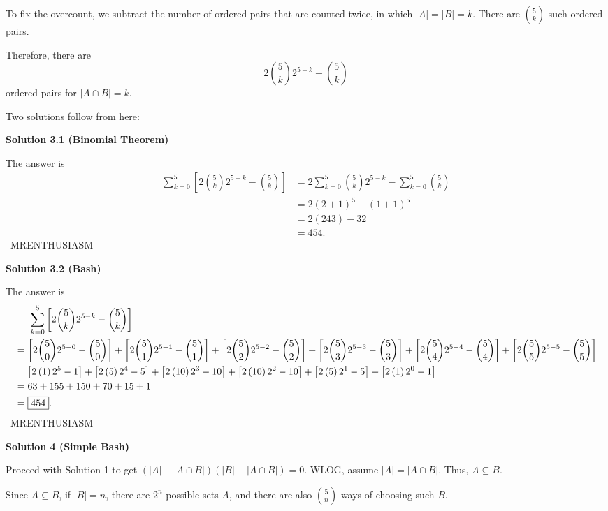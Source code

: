 \begin{enumerate}
 To fix the overcount, we subtract the number of ordered pairs that are counted twice, in which $|A|=|B|=k.$ There are $\binom{5}{k}$ such ordered pairs.

 Therefore, there are 
 \[2\binom{5}{k}2^{5-k}-\binom{5}{k}\] ordered pairs for $|A \cap B|=k.$

 Two solutions follow from here:

 



\textbf{Solution 3.1 (Binomial Theorem)}

The answer is 
 \begin{align*} \sum_{k=0}^{5}\left[2\binom{5}{k}2^{5-k}-\binom{5}{k}\right] &= 2\sum_{k=0}^{5}\binom{5}{k}2^{5-k}-\sum_{k=0}^{5}\binom{5}{k} \\ &=2(2+1)^5-(1+1)^5 \\ &=2(243)-32 \\ &=\boxed{454}. \end{align*}
~MRENTHUSIASM

 



\textbf{Solution 3.2 (Bash)}

The answer is 
 \begin{align*} &\hspace{5.125mm}\sum_{k=0}^{5}\left[2\binom{5}{k}2^{5-k}-\binom{5}{k}\right] \\ &=\left[2\binom{5}{0}2^{5-0}-\binom{5}{0}\right] + \left[2\binom{5}{1}2^{5-1}-\binom{5}{1}\right] + \left[2\binom{5}{2}2^{5-2}-\binom{5}{2}\right] + \left[2\binom{5}{3}2^{5-3}-\binom{5}{3}\right] + \left[2\binom{5}{4}2^{5-4}-\binom{5}{4}\right] + \left[2\binom{5}{5}2^{5-5}-\binom{5}{5}\right] \\ &=\left[2\left(1\right)2^5-1\right] + \left[2\left(5\right)2^4-5\right] + \left[2\left(10\right)2^3-10\right] + \left[2\left(10\right)2^2-10\right] + \left[2\left(5\right)2^1-5\right] + \left[2\left(1\right)2^0-1\right] \\ &=63+155+150+70+15+1 \\ &=\boxed{454}. \end{align*}
~MRENTHUSIASM

 



\textbf{Solution 4 (Simple Bash)}

Proceed with Solution 1 to get $(|A| - |A \cap B|)(|B| - |A \cap B|) = 0$. WLOG, assume $|A| = |A \cap B|$. Thus, $A \subseteq B$.

 Since $A \subseteq B$, if $|B| = n$, there are $2^n$ possible sets $A$, and there are also ${5 \choose n}$ ways of choosing such $B$.


\end{enumerate}
